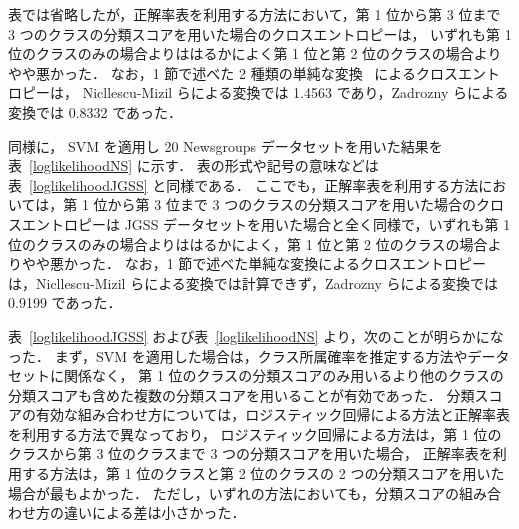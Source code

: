 \documentclass[japanese]{jnlp_1.4}
\begin{document}
表では省略したが，正解率表を利用する方法において，第 1 位から第 3 位まで 3 つのクラスの分類スコアを用いた場合のクロスエントロピーは，
いずれも第 1 位のクラスのみの場合よりははるかによく第 1 位と第 2 位のクラスの場合よりやや悪かった．
なお，1 節で述べた 2 種類の単純な変換~\cite{Mizil05,Zadrozny02} によるクロスエントロピーは，
Nicllescu-Mizil らによる変換では 1.4563 であり，Zadrozny らによる変換では 0.8332 であった．

同様に，
SVM を適用し 20 Newsgroups データセットを用いた結果を表~\ref{loglikelihoodNS} に示す．
表の形式や記号の意味などは表~\ref{loglikelihoodJGSS} と同様である．
ここでも，正解率表を利用する方法においては，第 1 位から第 3 位まで 3 つのクラスの分類スコアを用いた場合のクロスエントロピーは JGSS データセットを用いた場合と全く同様で，いずれも第 1 位のクラスのみの場合よりははるかによく，第 1 位と第 2 位のクラスの場合よりやや悪かった．
なお，1 節で述べた単純な変換によるクロスエントロピーは，Nicllescu-Mizil らによる変換では計算できず，Zadrozny らによる変換では 0.9199 であった．




\begin{table}[b]
\begin{center}
\label{loglikelihoodNS}

\end{center}
\end{table}

表~\ref{loglikelihoodJGSS} および表~\ref{loglikelihoodNS} より，次のことが明らかになった．
まず，SVM を適用した場合は，クラス所属確率を推定する方法やデータセットに関係なく，
第 1 位のクラスの分類スコアのみ用いるより他のクラスの分類スコアも含めた複数の分類スコアを用いることが有効であった．
分類スコアの有効な組み合わせ方については，ロジスティック回帰による方法と正解率表を利用する方法で異なっており，
ロジスティック回帰による方法は，第 1 位のクラスから第 3 位のクラスまで 3 つの分類スコアを用いた場合，
正解率表を利用する方法は，第 1 位のクラスと第 2 位のクラスの 2 つの分類スコアを用いた場合が最もよかった．
ただし，いずれの方法においても，分類スコアの組み合わせ方の違いによる差は小さかった．
 
\end{document}

